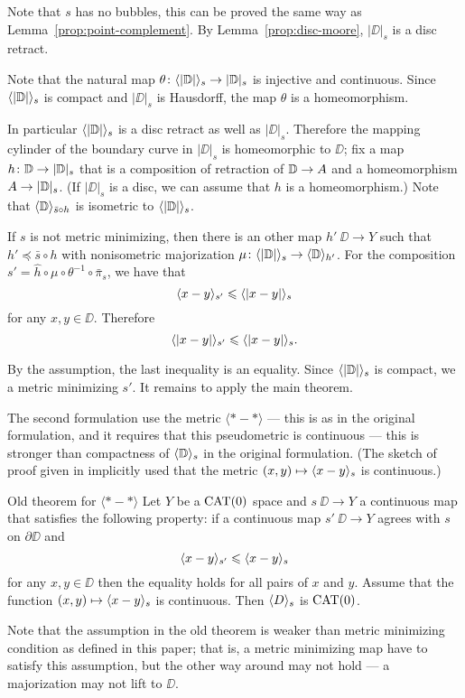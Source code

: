 Note that $s$ has no bubbles, this can be proved the same way as Lemma~\ref{prop:point-complement}.
By Lemma~\ref{prop:disc-moore},  $|\DD|_s$ is a disc retract.

Note that the natural map $\theta\colon\langle|\mathbb{D}|\rangle_s\to |\mathbb{D}|_s$ is injective and continuous.
Since $\langle|\mathbb{D}|\rangle_s$ is compact and $|\DD|_s$ is Hausdorff, the map $\theta$ is a homeomorphism.

In particular $\langle|\mathbb{D}|\rangle_s$ is a disc retract as well as $|\DD|_s$.
Therefore the mapping cylinder of the boundary curve in $|\DD|_s$ is homeomorphic to $\DD$;
fix a map $h\:\DD\zz\to|\DD|_s$ that is a composition of retraction of $\DD\zz\to A$ and a homeomorphism $A\zz\to  |\DD|_s$.
(If $|\DD|_s$ is a disc, we can assume that $h$ is a homeomorphism.)
Note that $\langle\mathbb{D}\rangle_{\bar s\circ h}$ is isometric to $\langle|\mathbb{D}|\rangle_s$.

If $s$ is not metric minimizing,
then there is an other map $h'\:\DD\to Y$ such that $h'\preccurlyeq  \bar s\circ h$ with nonisometric majorization $\mu\colon\langle|\mathbb{D}|\rangle_s\to \langle\mathbb{D}\rangle_{h'}$.
For the composition $s'=\hat h\circ \mu\circ \theta^{-1}\circ \bar \pi_s$, we have that 
\[\langle x-y\rangle_{s'}\leqslant \langle|x-y|\rangle_{s}\]
for any $x,y\in\DD$.
Therefore 
\[\langle|x-y|\rangle_{s'}\leqslant \langle|x-y|\rangle_{s}.\]

By the assumption, the last inequality is an equality.
Since $\langle|\mathbb{D}|\rangle_s$ is compact, we a metric minimizing $s'$. %
It remains to apply the main theorem.
\qeds

The second formulation use the metric $\langle{*}-{*}\rangle$ --- this is as in the original formulation,
and it requires that this pseudometric is continuous --- this is stronger than  
compactness of $\langle\mathbb{D}\rangle_s$ in the original formulation.
(The sketch of proof given in \cite{petrunin-metric-min} implicitly used that the metric $(x,y)\zz\mapsto\<x-y\>_{s}$ is continuous.)

\begin{thm}{Old theorem for $\bm{\langle{*}-{*}\rangle}$}\label{thm:old2}
Let $Y$ be a $\mathop{\rm CAT}\nolimits(0)$ space and $s\:\DD\to Y$ a continuous map that satisfies the following property: 
if a continuous map $s'\:\DD\to Y$ agrees with $s$ on $\partial\DD$ and
\[\langle x-y\rangle_{s'}\leqslant \langle x-y\rangle_{s}\]
for any $x,y\in \DD$
then the equality holds for all pairs of $x$ and $y$.
Assume that the function $(x,y)\mapsto\langle x-y\rangle_{s}$ is continuous.
Then $\langle D\rangle_s$ is $\mathop{\rm CAT}\nolimits(0)$.
\end{thm}

Note that the assumption in the old theorem is weaker than metric minimizing condition as defined in this paper;
that is, a metric minimizing map have to satisfy this assumption, but the other way around may not hold --- a majorization may not lift to $\DD$.


